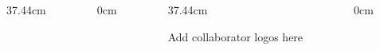 \documentclass[final]{beamer}
\begin{document}
\begin{frame}[t]
\begin{columns}[b]
\begin{column}{37.44cm}
\end{column}
\begin{column}{0cm}
\end{column}
\begin{column}{37.44cm}

        \begin{minipage}[t][5cm][t]{1.0\textwidth}
             Add collaborator logos here
        \end{minipage}%

\end{column}
\begin{column}{0cm} %
\end{column}
\end{columns}

\end{frame}
\end{document}
